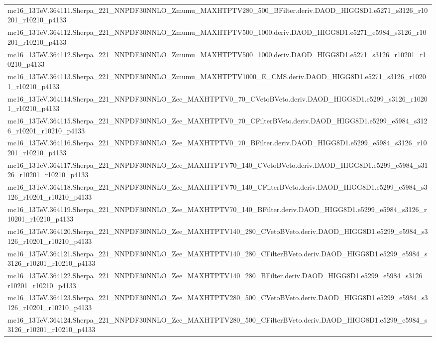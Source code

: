 \begin{adjustwidth}{-3em}{-3em}
\begin{longtable}{l}
mc16\_13TeV.364111.Sherpa\_221\_NNPDF30NNLO\_Zmumu\_MAXHTPTV280\_500\_BFilter.deriv.DAOD\_HIGG8D1.e5271\_s3126\_r10201\_r10210\_p4133 \\
mc16\_13TeV.364112.Sherpa\_221\_NNPDF30NNLO\_Zmumu\_MAXHTPTV500\_1000.deriv.DAOD\_HIGG8D1.e5271\_e5984\_s3126\_r10201\_r10210\_p4133 \\
mc16\_13TeV.364112.Sherpa\_221\_NNPDF30NNLO\_Zmumu\_MAXHTPTV500\_1000.deriv.DAOD\_HIGG8D1.e5271\_s3126\_r10201\_r10210\_p4133 \\
mc16\_13TeV.364113.Sherpa\_221\_NNPDF30NNLO\_Zmumu\_MAXHTPTV1000\_E\_CMS.deriv.DAOD\_HIGG8D1.e5271\_s3126\_r10201\_r10210\_p4133 \\
mc16\_13TeV.364114.Sherpa\_221\_NNPDF30NNLO\_Zee\_MAXHTPTV0\_70\_CVetoBVeto.deriv.DAOD\_HIGG8D1.e5299\_s3126\_r10201\_r10210\_p4133 \\
mc16\_13TeV.364115.Sherpa\_221\_NNPDF30NNLO\_Zee\_MAXHTPTV0\_70\_CFilterBVeto.deriv.DAOD\_HIGG8D1.e5299\_e5984\_s3126\_r10201\_r10210\_p4133 \\
mc16\_13TeV.364116.Sherpa\_221\_NNPDF30NNLO\_Zee\_MAXHTPTV0\_70\_BFilter.deriv.DAOD\_HIGG8D1.e5299\_e5984\_s3126\_r10201\_r10210\_p4133 \\
mc16\_13TeV.364117.Sherpa\_221\_NNPDF30NNLO\_Zee\_MAXHTPTV70\_140\_CVetoBVeto.deriv.DAOD\_HIGG8D1.e5299\_e5984\_s3126\_r10201\_r10210\_p4133 \\
mc16\_13TeV.364118.Sherpa\_221\_NNPDF30NNLO\_Zee\_MAXHTPTV70\_140\_CFilterBVeto.deriv.DAOD\_HIGG8D1.e5299\_e5984\_s3126\_r10201\_r10210\_p4133 \\
mc16\_13TeV.364119.Sherpa\_221\_NNPDF30NNLO\_Zee\_MAXHTPTV70\_140\_BFilter.deriv.DAOD\_HIGG8D1.e5299\_e5984\_s3126\_r10201\_r10210\_p4133 \\
mc16\_13TeV.364120.Sherpa\_221\_NNPDF30NNLO\_Zee\_MAXHTPTV140\_280\_CVetoBVeto.deriv.DAOD\_HIGG8D1.e5299\_e5984\_s3126\_r10201\_r10210\_p4133 \\
mc16\_13TeV.364121.Sherpa\_221\_NNPDF30NNLO\_Zee\_MAXHTPTV140\_280\_CFilterBVeto.deriv.DAOD\_HIGG8D1.e5299\_e5984\_s3126\_r10201\_r10210\_p4133 \\
mc16\_13TeV.364122.Sherpa\_221\_NNPDF30NNLO\_Zee\_MAXHTPTV140\_280\_BFilter.deriv.DAOD\_HIGG8D1.e5299\_e5984\_s3126\_r10201\_r10210\_p4133 \\
mc16\_13TeV.364123.Sherpa\_221\_NNPDF30NNLO\_Zee\_MAXHTPTV280\_500\_CVetoBVeto.deriv.DAOD\_HIGG8D1.e5299\_e5984\_s3126\_r10201\_r10210\_p4133 \\
mc16\_13TeV.364124.Sherpa\_221\_NNPDF30NNLO\_Zee\_MAXHTPTV280\_500\_CFilterBVeto.deriv.DAOD\_HIGG8D1.e5299\_e5984\_s3126\_r10201\_r10210\_p4133 \\

\end{longtable}
\end{adjustwidth}
